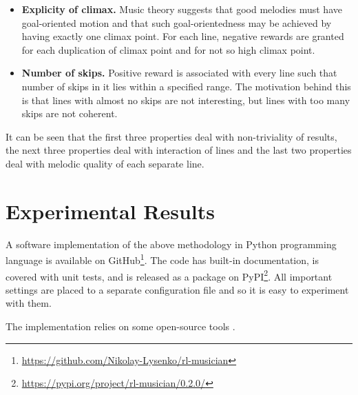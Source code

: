 \documentclass{article}
\begin{document}
\begin{itemize}
    \item \textbf{Explicity of climax.} Music theory suggests that good melodies must have goal-oriented motion and that such goal-orientedness may be achieved by having exactly one climax point. For each line, negative rewards are granted for each duplication of climax point and for not so high climax point.
    \item \textbf{Number of skips.} Positive reward is associated with every line such that number of skips in it lies within a specified range. The motivation behind this is that lines with almost no skips are not interesting, but lines with too many skips are not coherent.
\end{itemize}

It can be seen that the first three properties deal with non-triviality of results, the next three properties deal with interaction of lines and the last two properties deal with melodic quality of each separate line. 


\section{Experimental Results}
\label{sec:results}

A software implementation of the above methodology in Python programming language is available on GitHub\footnote{\url{https://github.com/Nikolay-Lysenko/rl-musician}}. The code has built-in documentation, is covered with unit tests, and is released as a package on PyPI\footnote{\url{https://pypi.org/project/rl-musician/0.2.0/}}. All important settings are placed to a separate configuration file and so it is easy to experiment with them.

The implementation relies on some open-source tools \cite{brockman2016openai,chollet2015keras,oliphant2006guide,raffel2014intuitive}.



\end{document}
